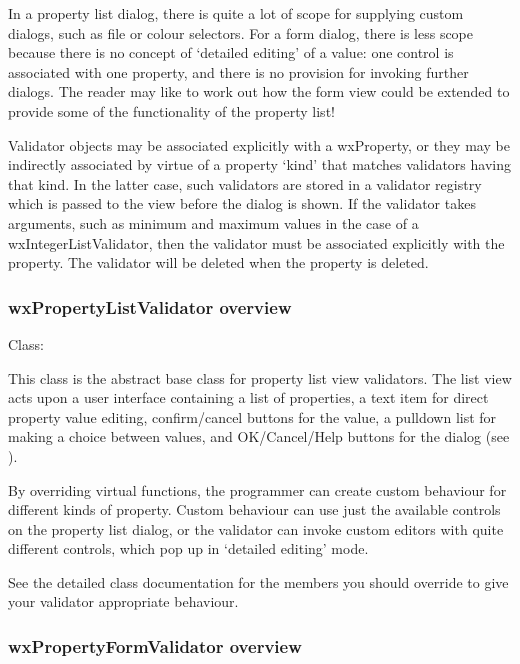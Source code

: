 In a property list dialog, there is quite a lot of scope for supplying custom dialogs,
such as file or colour selectors. For a form dialog, there is less scope because
there is no concept of `detailed editing' of a value: one control is associated with
one property, and there is no provision for invoking further dialogs. The reader
may like to work out how the form view could be extended to provide some of the
functionality of the property list!

Validator objects may be associated explicitly with a wxProperty, or they may be
indirectly associated by virtue of a property `kind' that matches validators having
that kind. In the latter case, such validators are stored in a validator registry
which is passed to the view before the dialog is shown. If the validator takes
arguments, such as minimum and maximum values in the case of a wxIntegerListValidator,
then the validator must be associated explicitly with the property. The validator
will be deleted when the property is deleted.

\subsubsection{wxPropertyListValidator overview}\label{wxpropertylistvalidatoroverview}

Class: 

This class is the abstract base class for property list view validators.
The list view acts upon a user interface containing a list of properties,
a text item for direct property value editing, confirm/cancel buttons for the value,
a pulldown list for making a choice between values, and OK/Cancel/Help buttons
for the dialog (see ).

By overriding virtual functions, the programmer can create custom
behaviour for different kinds of property. Custom behaviour can use just the
available controls on the property list dialog, or the validator can
invoke custom editors with quite different controls, which pop up in
`detailed editing' mode.

See the detailed class documentation for the members you should override
to give your validator appropriate behaviour.

\subsubsection{wxPropertyFormValidator overview}\label{wxpropertyformvalidatoroverview}

